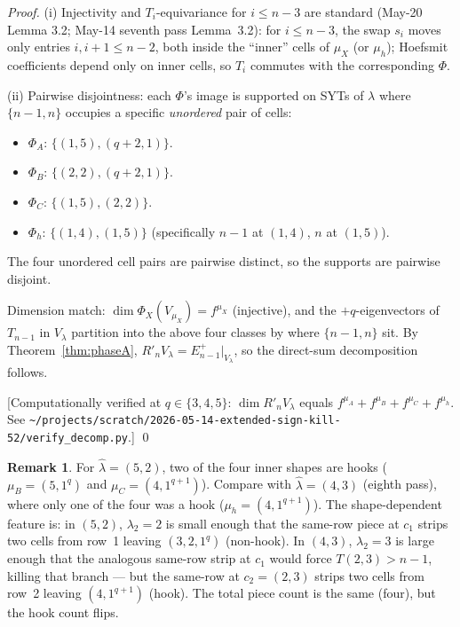 \documentclass[11pt]{article}
\theoremstyle{definition}
\newtheorem{remark}[theorem]{Remark}
\newcommand{\hatl}{\widehat\lambda}
\newcommand{\Rp}{{R'}}
\begin{document}
\begin{proof}
(i) Injectivity and $T_i$-equivariance for $i \le n - 3$ are standard
(May-20 Lemma 3.2; May-14 seventh pass Lemma~3.2): for $i \le n - 3$,
the swap $s_i$ moves only entries $i, i+1 \le n - 2$, both inside the
``inner'' cells of $\mu_X$ (or $\mu_h$); Hoefsmit coefficients depend
only on inner cells, so $T_i$ commutes with the corresponding $\Phi$.

(ii) Pairwise disjointness: each $\Phi$'s image is supported on SYTs of
$\lambda$ where $\{n - 1, n\}$ occupies a specific \emph{unordered} pair
of cells:
\begin{itemize}[topsep=0.2em,itemsep=0.1em]
\item $\Phi_A$: $\{(1, 5), (q+2, 1)\}$.
\item $\Phi_B$: $\{(2, 2), (q+2, 1)\}$.
\item $\Phi_C$: $\{(1, 5), (2, 2)\}$.
\item $\Phi_h$: $\{(1, 4), (1, 5)\}$ (specifically $n - 1$ at $(1, 4)$,
   $n$ at $(1, 5)$).
\end{itemize}
The four unordered cell pairs are pairwise distinct, so the supports
are pairwise disjoint.

Dimension match: $\dim \Phi_X(V_{\mu_X}) = f^{\mu_X}$ (injective), and
the $+q$-eigenvectors of $T_{n-1}$ in $V_\lambda$ partition into the
above four classes by where $\{n - 1, n\}$ sit.  By
Theorem~\ref{thm:phaseA}, $\Rp_n V_\lambda = E_{n-1}^+|_{V_\lambda}$, so
the direct-sum decomposition follows.

[Computationally verified at $q \in \{3, 4, 5\}$: $\dim \Rp_n V_\lambda$
equals $f^{\mu_A} + f^{\mu_B} + f^{\mu_C} + f^{\mu_h}$.  See
\texttt{\textasciitilde/projects/scratch/2026-05-14-extended-sign-kill-52/verify\_decomp.py}.]
\qed
\end{proof}

\begin{remark}\label{rem:two-hooks}
For $\hatl = (5, 2)$, two of the four inner shapes are hooks
($\mu_B = (5, 1^q)$ and $\mu_C = (4, 1^{q+1})$).  Compare with $\hatl =
(4, 3)$ (eighth pass), where only one of the four was a hook
($\mu_h = (4, 1^{q+1})$).  The shape-dependent feature is: in $(5, 2)$,
$\lambda_2 = 2$ is small enough that the same-row piece at $c_1$
strips two cells from row~1 leaving $(3, 2, 1^q)$ (non-hook).  In
$(4, 3)$, $\lambda_2 = 3$ is large enough that the analogous same-row
strip at $c_1$ would force $T(2, 3) > n - 1$, killing that branch ---
but the same-row at $c_2 = (2, 3)$ strips two cells from row~2 leaving
$(4, 1^{q+1})$ (hook).  The total piece count is the same (four), but
the hook count flips.
\end{remark}
\end{document}
